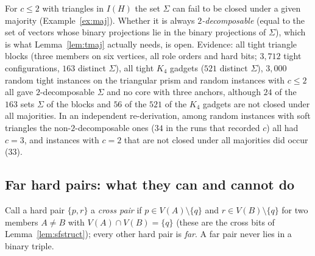 \begin{remark}\label{rem:tri2}
For $c\le2$ with triangles in $I(H)$ the set $\Sigma$ can fail to be closed under a given majority (Example~\ref{ex:maj}). Whether it is always \emph{$2$-decomposable} (equal to the set of vectors whose binary projections lie in the binary projections of $\Sigma$), which is what Lemma~\ref{lem:tmaj} actually needs, is open. Evidence: all tight triangle blocks (three members on six vertices, all role orders and hard bits; $3{,}712$ tight configurations, $163$ distinct $\Sigma$), all tight $K_4$ gadgets ($521$ distinct $\Sigma$), $3{,}000$ random tight instances on the triangular prism and random instances with $c\le2$ all gave $2$-decomposable $\Sigma$ and no core with three anchors, although $24$ of the $163$ sets $\Sigma$ of the blocks and $56$ of the $521$ of the $K_4$ gadgets are not closed under all majorities. In an independent re-derivation, among random instances with soft triangles the non-$2$-decomposable ones ($34$ in the runs that recorded $c$) all had $c=3$, and instances with $c=2$ that are not closed under all majorities did occur ($33$).
\end{remark}

\subsection{Far hard pairs: what they can and cannot do}\label{sec:softfar}
Call a hard pair $\{p,r\}$ a \emph{cross pair} if $p\in V(A)\setminus\{q\}$ and $r\in V(B)\setminus\{q\}$ for two members $A\ne B$ with $V(A)\cap V(B)=\{q\}$ (these are the cross bits of Lemma~\ref{lem:sfstruct}); every other hard pair is \emph{far}. A far pair never lies in a binary triple.

